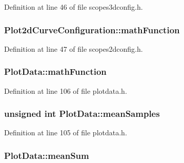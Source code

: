 Definition at line 46 of file scopes3dconfig.\-h.

\hypertarget{group___scope_plugin_gac0be9d46aeaed52d3ee1e796946969ed}{
\subsubsection[{math\-Function}]{ Plot2d\-Curve\-Configuration\-::math\-Function}}\label{group___scope_plugin_gac0be9d46aeaed52d3ee1e796946969ed}


Definition at line 47 of file scopes2dconfig.\-h.

\hypertarget{group___scope_plugin_gaa8ea6880a7faa36947144d2df62d6642}{
\subsubsection[{math\-Function}]{ Plot\-Data\-::math\-Function\hspace{0.3cm}{\ttfamily [protected]}}}\label{group___scope_plugin_gaa8ea6880a7faa36947144d2df62d6642}


Definition at line 106 of file plotdata.\-h.

\hypertarget{group___scope_plugin_ga577111acdda17558321da13bff25a7c0}{
\subsubsection[{mean\-Samples}]{\setlength{\rightskip}{0pt plus 5cm}unsigned {\bf int} Plot\-Data\-::mean\-Samples\hspace{0.3cm}{\ttfamily [protected]}}}\label{group___scope_plugin_ga577111acdda17558321da13bff25a7c0}


Definition at line 105 of file plotdata.\-h.

\hypertarget{group___scope_plugin_ga619dc668a50f1123f71de7baa4dc5f9c}{
\subsubsection[{mean\-Sum}]{ Plot\-Data\-::mean\-Sum\hspace{0.3cm}{\ttfamily [protected]}}}\label{group___scope_plugin_ga619dc668a50f1123f71de7baa4dc5f9c}


